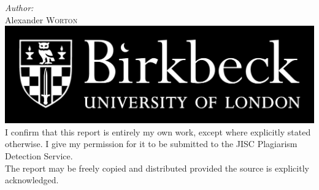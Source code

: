 \begin{titlepage}
\Large \emph{Author:}\\
Alexander \textsc{Worton}\\[2cm] %


\includegraphics[scale=0.15]{images/bbk1.png} 
\\[1cm]


\footnotesize{ I confirm that this report is entirely my own work, except where explicitly stated otherwise. I give my permission for it to be submitted to the JISC Plagiarism Detection Service.\\[0.4cm]

The report may be freely copied and distributed provided the source is explicitly acknowledged.}


 

\vfill %

\end{titlepage}